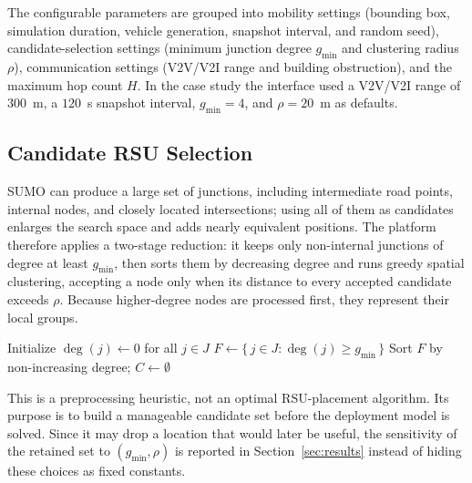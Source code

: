 \documentclass[engproc,proceedingpaper,submit,oneauthor]{Definitions/mdpi}
\begin{document}
The configurable parameters are grouped into mobility settings (bounding box,
simulation duration, vehicle generation, snapshot interval, and random seed),
candidate-selection settings (minimum junction degree $g_{\min}$ and clustering radius
$\rho$), communication settings (V2V/V2I range and building obstruction), and the
maximum hop count $H$. In the case study the interface used a V2V/V2I range of
$300$~m, a $120$~s snapshot interval, $g_{\min}=4$, and $\rho=20$~m as defaults.

\subsection{Candidate RSU Selection}
SUMO can produce a large set of junctions, including intermediate road points,
internal nodes, and closely located intersections; using all of them as candidates
enlarges the search space and adds nearly equivalent positions. The platform therefore
applies a two-stage reduction: it keeps only non-internal junctions of degree at least
$g_{\min}$, then sorts them by decreasing degree and runs greedy spatial clustering,
accepting a node only when its distance to every accepted candidate exceeds $\rho$.
Because higher-degree nodes are processed first, they represent their local groups.

\begin{algorithm}[H]
\caption{Candidate RSU filtering by degree and greedy spatial clustering}
\label{alg:candidates}
Initialize $\deg(j)\leftarrow 0$ for all $j\in J$\;
$F\leftarrow\{\,j\in J:\deg(j)\ge g_{\min}\,\}$\;
Sort $F$ by non-increasing degree; \quad $C\leftarrow\emptyset$\;
\;
\end{algorithm}

This is a preprocessing heuristic, not an optimal RSU-placement algorithm. Its purpose
is to build a manageable candidate set before the deployment model is solved. Since it
may drop a location that would later be useful, the sensitivity of the retained set to
$(g_{\min},\rho)$ is reported in Section~\ref{sec:results} instead of hiding these
choices as fixed constants.
\end{document}
